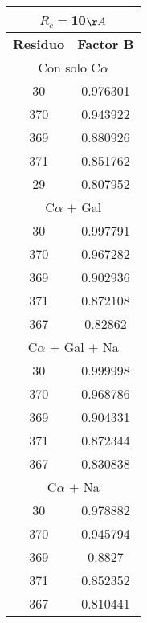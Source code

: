 \begin{tabular}[c]{|c|c|}
\multicolumn{2}{c}{$R_c=$10$\AA$}\\\hline
\textbf{Residuo}&\textbf{Factor B}\\\hline
\multicolumn{2}{c}{Con solo C$\alpha$}\\\hline
        30&  0.976301\\
       370&  0.943922\\
       369&  0.880926\\
       371&  0.851762\\
        29&  0.807952\\
\hline
\multicolumn{2}{c}{C$\alpha$ $+$ Gal}\\\hline
        30&  0.997791\\
       370&  0.967282\\
       369&  0.902936\\
       371&  0.872108\\
       367&   0.82862\\
\hline
\multicolumn{2}{c}{C$\alpha$ $+$ Gal $+$ Na}\\\hline
        30&  0.999998\\
       370&  0.968786\\
       369&  0.904331\\
       371&  0.872344\\
       367&  0.830838\\
\hline
\multicolumn{2}{c}{C$\alpha$ $+$ Na}\\\hline
        30&  0.978882\\
       370&  0.945794\\
       369&    0.8827\\
       371&  0.852352\\
       367&  0.810441\\
\hline
\end{tabular}
